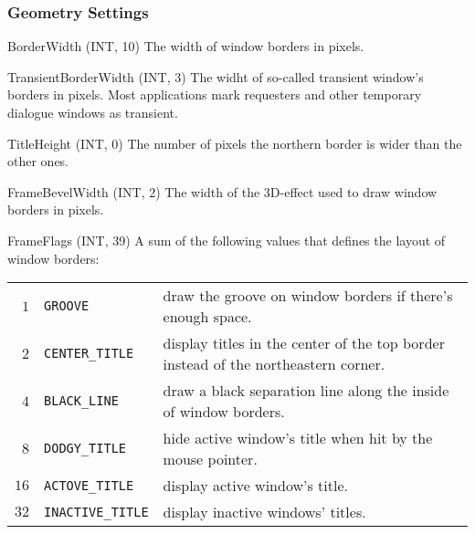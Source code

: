 \documentclass[10pt,a4paper]{article}
\newenvironment{ttdesc}[1]{
   \begin{list}{}{
          \renewcommand{\makelabel}[1]{\texttt{##1\hfill}}}}{\end{list}}
\begin{document}
\subsubsection{Geometry Settings}
\begin{ttdesc}{description}
\item[BorderWidth (INT, 10)] The width of window borders in pixels.
\item[TransientBorderWidth (INT, 3)] The widht of so-called transient window's
borders in pixels. Most applications mark requesters and other temporary
dialogue windows as transient.
\item[TitleHeight (INT, 0)] The number of pixels the northern border is wider
than the other ones.
\item[FrameBevelWidth (INT, 2)] The width of the 3D-effect used to draw window
borders in pixels.
\item[FrameFlags (INT, 39)] A sum of the following values that defines the
layout of window borders:\\[\smallskipamount]
\begin{tabular}{rlp{7cm}}
$1$  & \texttt{GROOVE} & draw the groove on window borders if there's enough
space.\\
$2$ & \texttt{CENTER\_TITLE} & display titles in the center of the top border
instead of the northeastern corner.\\
$4$  & \texttt{BLACK\_LINE} & draw a black separation line along the inside of
window borders.\\
$8$ & \texttt{DODGY\_TITLE} & hide active window's title when hit by the mouse
pointer.\\
$16$  & \texttt{ACTOVE\_TITLE} & display active window's title.\\
$32$  & \texttt{INACTIVE\_TITLE} & display inactive windows' titles.\\
\end{tabular}\\


\end{ttdesc}
\end{document}
